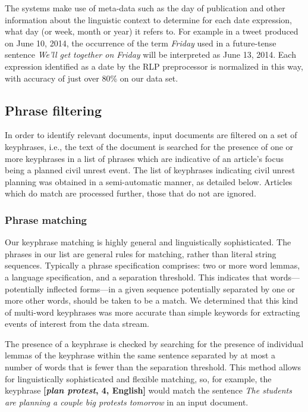 \documentclass[letterpaper]{article}
\begin{document}
The systems make use of meta-data such as the day of publication and
other information about the linguistic context to determine for each
date expression, what day (or week, month or year) it refers to. For
example in a tweet produced on June 10, 2014, the occurrence of the
term {\em Friday} used in a future-tense sentence {\em We'll get
  together on Friday} will be interpreted as June 13, 2014.  Each
expression identified as a date by the RLP preprocessor is normalized
in this way, with accuracy of just over 80\% on our data set.

\subsection{Phrase filtering}
In order to identify relevant documents, input documents are filtered on
a set of keyphrases, i.e., the text of the document is searched for the
presence of one or more keyphrases in a list of phrases which are
indicative of an article's focus being a planned civil unrest event.
The list of keyphrases indicating civil unrest planning was obtained in
a semi-automatic manner, as detailed below.  Articles which do match are
processed further, those that do not are ignored.

\subsubsection{Phrase matching}
Our keyphrase matching is highly general and linguistically
sophisticated.  The phrases in our list are general rules for matching,
rather than literal string sequences. Typically a phrase specification
comprises: two or more word lemmas, a language specification, and a
separation threshold. This indicates that words---potentially inflected
forms---in a given sequence potentially separated by one or more other
words, should be taken to be a match. We determined that this kind of
multi-word keyphrases was more accurate than simple keywords for
extracting events of interest from the data stream.

The presence of a keyphrase is checked by searching for the presence of
individual lemmas of the keyphrase within the same sentence separated
by at most a number of words that is fewer than the separation
threshold.  This method allows for linguistically sophisticated and
flexible matching, so, for example, the keyphrase {\bf [{\em plan
protest}, 4, English]} would match the sentence {\em The students are
planning a couple big protests tomorrow} in an input document.
\end{document}
